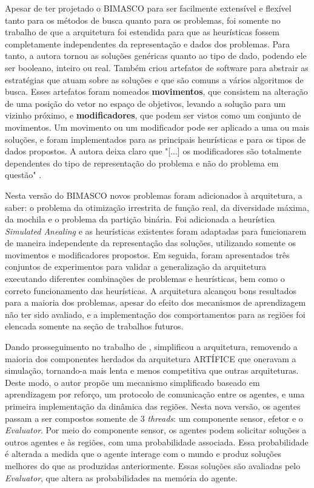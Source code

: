 Apesar de  ter projetado o BIMASCO para ser facilmente extensível e flexível tanto para os métodos de busca quanto para os problemas, foi somente no trabalho de  que a arquitetura foi estendida para que as heurísticas fossem completamente independentes da representação e dados dos problemas. Para tanto, a autora tornou as soluções genéricas quanto ao tipo de dado, podendo ele ser booleano, inteiro ou real. Também criou artefatos de software para abstrair as estratégias que atuam sobre as soluções e que são comuns a vários algoritmos de busca. Esses artefatos foram nomeados \textbf{movimentos}, que consistem na alteração de uma posição do vetor no espaço de objetivos, levando a solução para um vizinho próximo, e  \textbf{modificadores}, que podem ser vistos como um conjunto de movimentos. Um movimento ou um modificador pode ser aplicado a uma ou mais soluções, e foram implementados para as principais heurísticas e para os tipos de dados propostos. A autora deixa claro que "[...]  os modificadores são totalmente dependentes do tipo de
representação do problema e não do problema em questão" \cite{denise2014}. 

Nesta versão do BIMASCO novos problemas foram adicionados à arquitetura, a saber: o problema da otimização irrestrita de função real,  da diversidade máxima, da mochila e o problema da partição binária. Foi adicionada a heurística \textit{Simulated Anealing} e as heurísticas existentes foram adaptadas para funcionarem de maneira independente da representação das soluções, utilizando somente os movimentos e modificadores propostos. Em seguida, foram apresentados três conjuntos de experimentos para validar a generalização da arquitetura executando diferentes combinações de problemas e heurísticas, bem como o correto funcionamento das heurísticas. A arquitetura alcançou bons resultados para a maioria dos problemas, apesar do efeito dos mecanismos de aprendizagem não ter sido avaliado, e a implementação dos comportamentos para as regiões foi elencada somente na seção de trabalhos futuros. 

Dando prosseguimento no trabalho de ,  simplificou a arquitetura, removendo a maioria dos componentes herdados da arquitetura ARTÍFICE que oneravam a simulação, tornando-a mais lenta e menos competitiva que outras arquiteturas. Deste modo, o autor propõe um mecanismo simplificado baseado em aprendizagem  por reforço, um protocolo de comunicação entre os agentes, e uma primeira implementação da dinâmica das regiões. Nesta nova versão, os agentes passam a ser compostos somente de 3 \textit{threads}: um componente sensor, efetor e o \textit{Evaluator}. Por meio do componente sensor, os agentes podem solicitar soluções a outros agentes e às regiões, com uma probabilidade associada. Essa probabilidade é alterada a medida que o agente interage com o mundo e produz soluções melhores do que as produzidas anteriormente. Essas soluções são avaliadas pelo \textit{Evaluator}, que altera as probabilidades na memória do agente. 

